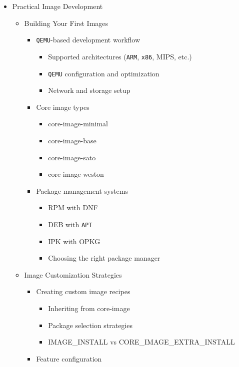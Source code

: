 \documentclass[
]{article}
\providecommand{\tightlist}{%
  \setlength{\itemsep}{0pt}\setlength{\parskip}{0pt}}
\begin{document}
\begin{itemize}
\tightlist
\item
  Practical Image Development

  \begin{itemize}
  \tightlist
  \item
    Building Your First Images

    \begin{itemize}
    \tightlist
    \item
      \texttt{QEMU}-based development workflow

      \begin{itemize}
      \tightlist
      \item
        Supported architectures (\texttt{ARM}, \texttt{x86}, MIPS, etc.)
      \item
        \texttt{QEMU} configuration and optimization
      \item
        Network and storage setup
      \end{itemize}
    \item
      Core image types

      \begin{itemize}
      \tightlist
      \item
        core-image-minimal
      \item
        core-image-base
      \item
        core-image-sato
      \item
        core-image-weston
      \end{itemize}
    \item
      Package management systems

      \begin{itemize}
      \tightlist
      \item
        RPM with DNF
      \item
        DEB with \texttt{APT}
      \item
        IPK with OPKG
      \item
        Choosing the right package manager
      \end{itemize}
    \end{itemize}
  \item
    Image Customization Strategies

    \begin{itemize}
    \tightlist
    \item
      Creating custom image recipes

      \begin{itemize}
      \tightlist
      \item
        Inheriting from core-image
      \item
        Package selection strategies
      \item
        IMAGE\_INSTALL vs CORE\_IMAGE\_EXTRA\_INSTALL
      \end{itemize}
    \item
      Feature configuration


\end{itemize}
\end{itemize}
\end{itemize}
\end{document}
